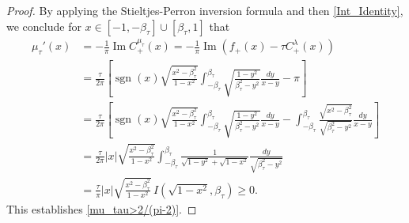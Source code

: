 \documentclass[reqno,11pt]{amsart}
\theoremstyle{plain}
\theoremstyle{definition}
\theoremstyle{remark}
\numberwithin{equation}{section}
\begin{document}
\begin{proof}
    By applying the Stieltjes-Perron inversion formula and then \eqref{Int_Identity}, we conclude for \newline$x\in [-1,-\beta_\tau]\cup[\beta_\tau,1]$ that
    \begin{align*}
        \mu_\tau'(x)&=-\frac{1}{\pi}\operatorname{Im}C_+^{\mu_\tau}(x)=-\frac{1}{\pi}\operatorname{Im}\left(f_+(x)-\tau C_+^{\lambda}(x)\right)\\
        &=\frac{\tau}{2\pi}\left[\operatorname{sgn}(x)\sqrt{\frac{x^2-\beta_\tau^2}{1-x^2}}\int_{-\beta_\tau}^{\beta_\tau}\sqrt{\frac{1-y^2}{\beta_\tau^2-y^2}}\frac{dy}{x-y}-\pi\right]\\
        &=\frac{\tau}{2\pi}\left[\operatorname{sgn}(x)\sqrt{\frac{x^2-\beta_\tau^2}{1-x^2}}\int_{-\beta_\tau}^{\beta_\tau}\sqrt{\frac{1-y^2}{\beta_\tau^2-y^2}}\frac{dy}{x-y}-\int_{-\beta_\tau}^{\beta_\tau}\frac{\sqrt{x^2-\beta_\tau^2}}{\sqrt{\beta^2_\tau-y^2}}\frac{dy}{x-y}\right]\\
        &=\frac{\tau}{2\pi}|x|\sqrt{\frac{x^2-\beta_\tau^2}{1-x^2}}\int_{-\beta_\tau}^{\beta_\tau}\frac{1}{\sqrt{1-y^2}+\sqrt{1-x^2}}\frac{dy}{\sqrt{\beta_\tau^2-y^2}} \\
        &= \frac{\tau}{ \pi}|x|\sqrt{\frac{x^2-\beta_\tau^2}{1-x^2}}\, I\left(\sqrt{1-x^2},\beta_\tau \right)\ge 0.
    \end{align*}
This establishes \eqref{mu_tau>2/(pi-2)}.
\end{proof}
\end{document}
